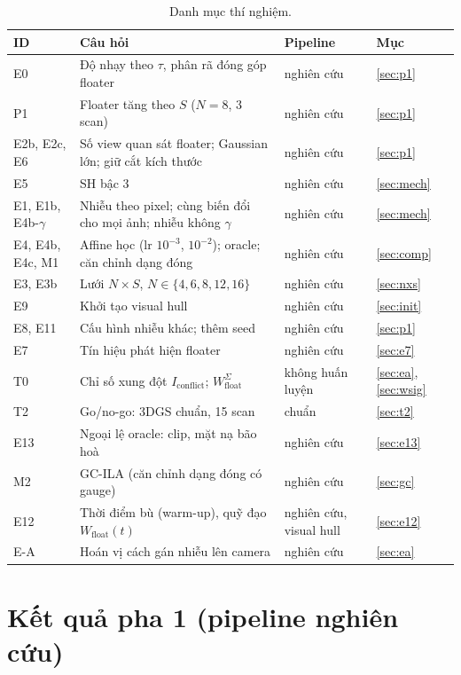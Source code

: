 \documentclass[11pt,a4paper]{article}
\newcommand{\W}{W_{\text{float}}}
\begin{document}
\begin{table}[H]
\centering\small
\caption{Danh mục thí nghiệm.}
\begin{tabularx}{\textwidth}{@{}l Y l l@{}}
\toprule
ID & Câu hỏi & Pipeline & Mục \\
\midrule
E0 & Độ nhạy theo $\tau$, phân rã đóng góp floater & nghiên cứu & \ref{sec:p1} \\
P1 & Floater tăng theo $S$ ($N=8$, 3 scan) & nghiên cứu & \ref{sec:p1} \\
E2b, E2c, E6 & Số view quan sát floater; Gaussian lớn; giữ cắt kích thước & nghiên cứu & \ref{sec:p1} \\
E5 & SH bậc 3 & nghiên cứu & \ref{sec:mech} \\
E1, E1b, E4b-$\gamma$ & Nhiễu theo pixel; cùng biến đổi cho mọi ảnh; nhiễu không $\gamma$ & nghiên cứu & \ref{sec:mech} \\
E4, E4b, E4c, M1 & Affine học (lr $10^{-3}$, $10^{-2}$); oracle; căn chỉnh dạng đóng & nghiên cứu & \ref{sec:comp} \\
E3, E3b & Lưới $N\times S$, $N\in\{4,6,8,12,16\}$ & nghiên cứu & \ref{sec:nxs} \\
E9 & Khởi tạo visual hull & nghiên cứu & \ref{sec:init} \\
E8, E11 & Cấu hình nhiễu khác; thêm seed & nghiên cứu & \ref{sec:p1} \\
E7 & Tín hiệu phát hiện floater & nghiên cứu & \ref{sec:e7} \\
T0 & Chỉ số xung đột $I_{\text{conflict}}$; $\W^\Sigma$ & không huấn luyện & \ref{sec:ea}, \ref{sec:wsig} \\
T2 & Go/no-go: 3DGS chuẩn, 15 scan & chuẩn & \ref{sec:t2} \\
E13 & Ngoại lệ oracle: clip, mặt nạ bão hoà & nghiên cứu & \ref{sec:e13} \\
M2 & GC-ILA (căn chỉnh dạng đóng có gauge) & nghiên cứu & \ref{sec:gc} \\
E12 & Thời điểm bù (warm-up), quỹ đạo $\W(t)$ & nghiên cứu, visual hull & \ref{sec:e12} \\
E-A & Hoán vị cách gán nhiễu lên camera & nghiên cứu & \ref{sec:ea} \\
\bottomrule
\end{tabularx}
\end{table}

\section{Kết quả pha 1 (pipeline nghiên cứu)}
\end{document}
